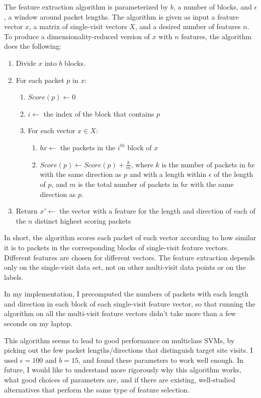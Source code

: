 \documentclass[10pt, twocolumn]{article}
\begin{document}
The feature extraction algorithm is parameterized by $b$, a number of blocks, and $\epsilon$, a window around packet lengths.
The algorithm is given as input a feature vector $x$, a matrix of single-visit vectors $X$, and a desired number of 
features $n$. To produce a dimensionality-reduced version of $x$ with $n$ features, the algorithm does the following:
\begin{enumerate}
\item Divide $x$ into $b$ blocks.
\item For each packet $p$ in $x$:
\begin{enumerate}
\item $Score(p) \leftarrow 0$
\item $i \leftarrow $ the index of the block that contains $p$
\item For each vector $x \in X$:
\begin{enumerate}
\item $bx \leftarrow $ the packets in the $i^{th}$ block of $x$
\item $Score(p) \leftarrow Score(p) + \frac{k}{m}$, where $k$ is the number of packets in $bx$ with the same direction as $p$ and with a length within $\epsilon$ of the length of $p$, and $m$ is the total number of packets in $bx$ with the same direction as $p$.
\end{enumerate}
\end{enumerate}
\item Return $x' \leftarrow $ the vector with a feature for the length and direction of each of the $n$ distinct highest scoring packets
\end{enumerate}

In short, the algorithm scores each packet of each vector according to how similar it is to packets in the corresponding blocks of
single-visit feature vectors. Different features are chosen for different vectors. The feature extraction depends only on the 
single-visit data set, not on other multi-visit data points or on the labels.

In my implementation, I precomputed the numbers of packets with each length and direction in each block of each single-visit 
feature vector, so that running the algorithm on all the multi-visit feature vectors didn't take more than a few seconds on my 
laptop.

This algorithm seems to lead to good performance on multiclass SVMs, by picking out the few packet lengths/directions that 
distinguish target site visits. I used $\epsilon=100$ and $b=15$, and found these parameters to work well enough.
 In future, I would like to understand more rigorously why this algorithm works, what good choices of parameters are,
  and if there are
existing, well-studied alternatives that perform the same type of feature selection.
\end{document}
